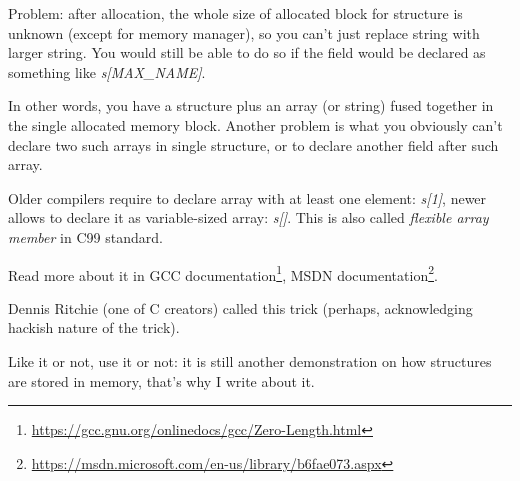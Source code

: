 Problem: after allocation, the whole size of allocated block for structure is unknown (except for memory manager),
so you can't just replace string with larger string.
You would still be able to do so if the field would be declared as something like \emph{s[MAX\_NAME]}.

In other words, you have a structure plus an array (or string) fused together in the single allocated memory block.
Another problem is what you obviously can't declare two such arrays in single structure, or to declare another field
after such array.

Older compilers require to declare array with at least one element: \emph{s[1]}, newer allows to declare it as variable-sized
array: \emph{s[]}.
This is also called \emph{flexible array member}
in C99 standard.

Read more about it in
GCC documentation\footnote{\url{https://gcc.gnu.org/onlinedocs/gcc/Zero-Length.html}},
MSDN documentation\footnote{\url{https://msdn.microsoft.com/en-us/library/b6fae073.aspx}}.

Dennis Ritchie (one of C creators) called this trick  
(perhaps, acknowledging hackish nature of the trick).

Like it or not, use it or not:
it is still another demonstration on how structures are stored in memory, that's why I write about it.

